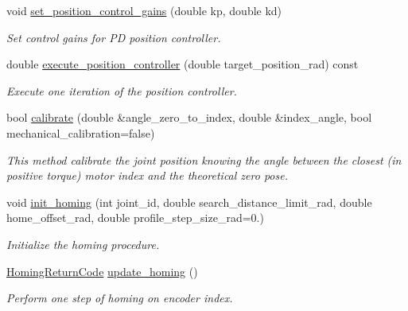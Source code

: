 \begin{DoxyCompactItemize}
void \hyperlink{classblmc__robots_1_1BlmcJointModule_a464ab2a846630eba6582d09895df2852}{set\+\_\+position\+\_\+control\+\_\+gains} (double kp, double kd)
\begin{DoxyCompactList}\small\item\em Set control gains for PD position controller. \end{DoxyCompactList}\item 
double \hyperlink{classblmc__robots_1_1BlmcJointModule_a3ee1d234e2e86d81d3acc687c4c2430e}{execute\+\_\+position\+\_\+controller} (double target\+\_\+position\+\_\+rad) const 
\begin{DoxyCompactList}\small\item\em Execute one iteration of the position controller. \end{DoxyCompactList}\item 
bool \hyperlink{classblmc__robots_1_1BlmcJointModule_a17a1da041dae31e9a16f955722c36d6c}{calibrate} (double \&angle\+\_\+zero\+\_\+to\+\_\+index, double \&index\+\_\+angle, bool mechanical\+\_\+calibration=false)
\begin{DoxyCompactList}\small\item\em This method calibrate the joint position knowing the angle between the closest (in positive torque) motor index and the theoretical zero pose. \end{DoxyCompactList}\item 
void \hyperlink{classblmc__robots_1_1BlmcJointModule_aa534604b5ead6a3eee5c47a9454f6834}{init\+\_\+homing} (int joint\+\_\+id, double search\+\_\+distance\+\_\+limit\+\_\+rad, double home\+\_\+offset\+\_\+rad, double profile\+\_\+step\+\_\+size\+\_\+rad=0.)
\begin{DoxyCompactList}\small\item\em Initialize the homing procedure. \end{DoxyCompactList}\item 
\hyperlink{blmc__joint__module_8hpp_aa1075809042ff261e4b0a20d161448b6}{Homing\+Return\+Code} \hyperlink{classblmc__robots_1_1BlmcJointModule_abb2712542f3c340bc0ecf76bd343b6b3}{update\+\_\+homing} ()
\begin{DoxyCompactList}\small\item\em Perform one step of homing on encoder index. \end{DoxyCompactList}\end{DoxyCompactItemize}
